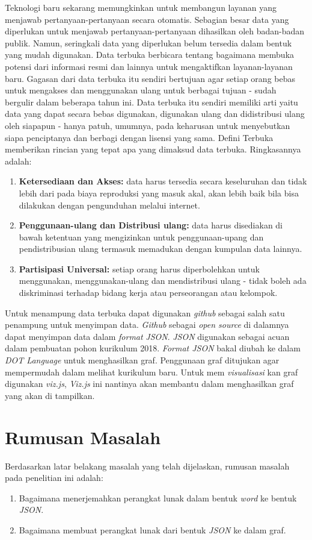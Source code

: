 Teknologi baru sekarang memungkinkan untuk membangun layanan yang menjawab pertanyaan-pertanyaan secara otomatis. Sebagian besar data yang diperlukan untuk menjawab pertanyaan-pertanyaan dihasilkan oleh badan-badan publik. Namun, seringkali data yang diperlukan belum tersedia dalam bentuk yang mudah digunakan. Data terbuka berbicara tentang bagaimana membuka potensi dari informasi resmi dan lainnya untuk mengaktifkan layanan-layanan baru. Gagasan dari data terbuka itu sendiri bertujuan agar setiap orang bebas untuk mengakses dan menggunakan ulang untuk berbagai tujuan - sudah bergulir dalam beberapa tahun ini. Data terbuka itu sendiri memiliki arti yaitu data yang dapat secara bebas digunakan, digunakan ulang dan didistribusi ulang oleh siapapun - hanya patuh, umumnya, pada keharusan untuk menyebutkan siapa penciptanya dan berbagi dengan lisensi yang sama. Defini Terbuka memberikan rincian yang tepat apa yang dimaksud data terbuka. Ringkasannya adalah:
\begin{enumerate}
\item \textbf{Ketersediaan dan Akses:} data harus tersedia secara keseluruhan dan tidak lebih dari pada biaya reproduksi yang masuk akal, akan lebih baik bila bisa dilakukan dengan pengunduhan melalui internet.
\item \textbf{Penggunaan-ulang dan Distribusi ulang:} data harus disediakan di bawah ketentuan yang mengizinkan untuk penggunaan-upang dan pendistribusian ulang termasuk memadukan dengan kumpulan data lainnya.
\item \textbf{Partisipasi Universal:} setiap orang harus diperbolehkan untuk menggunakan, menggunakan-ulang dan mendistribusi ulang - tidak boleh ada diskriminasi terhadap bidang kerja atau perseorangan atau kelompok.
\end{enumerate}

Untuk menampung data terbuka dapat digunakan \textit{github} sebagai salah satu penampung untuk menyimpan data. \textit{Github} sebagai \textit{open source} di dalamnya dapat menyimpan data dalam \textit{format} \textit{JSON}. \textit{JSON} digunakan sebagai acuan dalam pembuatan pohon kurikulum 2018. \textit{Format JSON} bakal diubah ke dalam \textit{DOT Language} untuk menghasilkan graf. Penggunaan graf ditujukan agar mempermudah dalam melihat kurikulum baru. Untuk mem \textit{visualisasi} kan graf digunakan \textit{viz.js}, \textit{Viz.js} ini nantinya akan membantu dalam menghasilkan graf yang akan di tampilkan.

\section{Rumusan Masalah}
Berdasarkan latar belakang masalah yang telah dijelaskan, rumusan masalah pada penelitian ini adalah:
\begin{enumerate}
\item Bagaimana menerjemahkan perangkat lunak dalam bentuk \textit{word} ke bentuk \textit{JSON}.
\item Bagaimana membuat perangkat lunak dari bentuk \textit{JSON} ke dalam graf.
\end{enumerate} 


